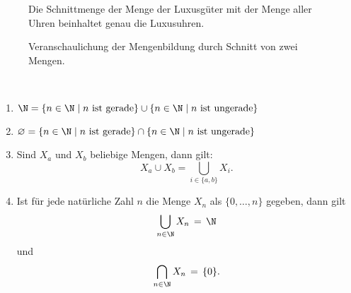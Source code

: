 \begin{figure*}[h]
\begin{example}
Die Schnittmenge der Menge der Luxusgüter mit der Menge aller Uhren beinhaltet genau die Luxusuhren.
\begin{center}
\begin{framed}
\def\firstcircle{(0,0) circle (1.8cm)}
\def\secondcircle{(2.5,0) circle (1.8cm)}



\setlength{\parskip}{5mm}

\caption*{Veranschaulichung der Mengenbildung durch Schnitt von zwei Mengen.}
\end{framed}
\end{center}
\end{example}
\end{figure*}

\begin{example}\label{bsp:vereinSchnitt}~
\begin{enumerate}
\item $\N=\{n\in \N\mid n\text{ ist gerade}\}\cup \{n\in \N\mid n\text{ ist ungerade}\}$
\item $\varnothing=\{n\in \N\mid n\text{ ist gerade}\}\cap \{n\in \N\mid n\text{ ist ungerade}\}$
\item Sind $X_a$ und $X_b$ beliebige Mengen, dann gilt:
\[
X_a\cup X_b=\bigcup_{i\in\{a,b\}}X_i.
\]
\item Ist für jede natürliche Zahl $n$ die Menge $X_n$ als $\{0,\dots, n\}$ gegeben, dann gilt
\[
\bigcup_{n\in \N}X_n\,=\,\N
\]
und
\[
\bigcap_{n\in \N}X_n\,=\,\{0\}.
\]
\end{enumerate}
\end{example}


